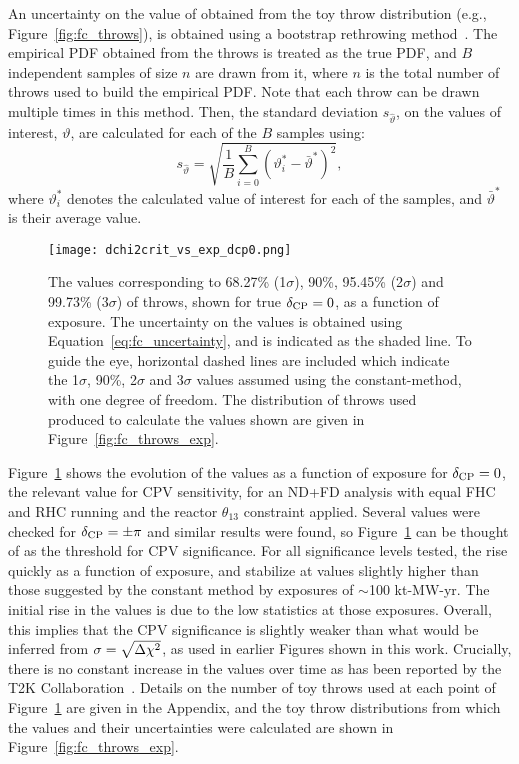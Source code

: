 An uncertainty on the value of \dchisqcrit obtained from the toy throw distribution (e.g., Figure~\ref{fig:fc_throws}), is obtained using a bootstrap rethrowing method~\cite{rice2006mathematical}. The empirical PDF obtained from the throws is treated as the true PDF, and $B$ independent samples of size $n$ are drawn from it, where $n$ is the total number of throws used to build the empirical PDF. Note that each throw can be drawn multiple times in this method. Then, the standard deviation $s_{\hat{\vartheta}}$, on the \dchisqcrit values of interest, $\vartheta$, are calculated for each of the $B$ samples using:
\begin{equation}
  s_{\hat{\vartheta}} = \sqrt{\frac{1}{B} \sum^{B}_{i=0} (\vartheta_{i}^{*} - \bar{\vartheta}^{*})^{2}},
  \label{eq:fc_uncertainty}
\end{equation}
where $\vartheta_{i}^{*}$ denotes the calculated \dchisqcrit value of interest for each of the samples, and $\bar{\vartheta}^{*}$ is their average value.

\begin{figure}[htbp]
  \centering
  \texttt{[image: dchi2crit\_vs\_exp\_dcp0.png]}
  \caption{The \dchisqcrit values corresponding to 68.27\% (1$\sigma$), 90\%, 95.45\% (2$\sigma$) and 99.73\% (3$\sigma$) of throws, shown for true $\delta_{\rm CP} = 0$, as a function of exposure. The uncertainty on the \dchisqcrit values is obtained using Equation~\ref{eq:fc_uncertainty}, and is indicated as the shaded line. To guide the eye, horizontal dashed lines are included which indicate the 1$\sigma$, 90\%, 2$\sigma$ and 3$\sigma$ \dchisq values assumed using the constant-\dchisq method, with one degree of freedom. The distribution of throws used produced to calculate the \dchisqcrit values shown are given in Figure~\ref{fig:fc_throws_exp}.}
  \label{fig:fc_vs_exp}
\end{figure}
Figure~\ref{fig:fc_vs_exp} shows the evolution of the \dchisqcrit values as a function of exposure for $\delta_{\rm CP} = 0$, the relevant value for CPV sensitivity, for an ND+FD analysis with equal FHC and RHC running and the reactor $\theta_{13}$ constraint applied. Several values were checked for $\delta_{\rm CP} = \pm\pi$ and similar results were found, so Figure~\ref{fig:fc_vs_exp} can be thought of as the threshold for CPV significance. For all significance levels tested, the \dchisqcrit rise quickly as a function of exposure, and stabilize at values slightly higher than those suggested by the constant \dchisq method by exposures of $\sim$100 kt-MW-yr. The initial rise in the \dchisqcrit values is due to the low statistics at those exposures. Overall, this implies that the CPV significance is slightly weaker than what would be inferred from $\sigma = \sqrt{\Delta\chi^{2}}$, as used in earlier Figures shown in this work. Crucially, there is no constant increase in the \dchisqcrit values over time as has been reported by the T2K Collaboration~\cite{Abe:2021gky}. Details on the number of toy throws used at each point of Figure~\ref{fig:fc_vs_exp} are given in the Appendix, and the toy throw distributions from which the \dchisqcrit values and their uncertainties were calculated are shown in Figure~\ref{fig:fc_throws_exp}.

